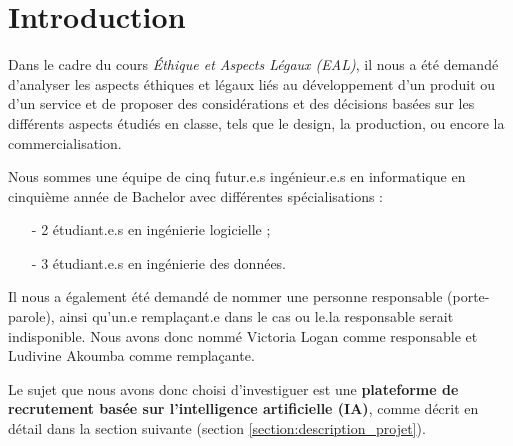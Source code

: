 \section{Introduction} 

Dans le cadre du cours \textit{Éthique et Aspects Légaux (EAL)}, il nous a été demandé d'analyser les aspects éthiques et légaux liés au développement d'un produit ou d'un service et de proposer des considérations et des décisions basées sur les différents aspects étudiés en classe, tels que le design, la production, ou encore la commercialisation.\newline

Nous sommes une équipe de cinq futur.e.s ingénieur.e.s en informatique en cinquième année de Bachelor avec différentes spécialisations :

\begin{enumerate}
    \item[-] 2 étudiant.e.s en ingénierie logicielle ; 
    \item[-] 3 étudiant.e.s en ingénierie des données.
\end{enumerate}


Il nous a également été demandé de nommer une personne responsable (porte-parole), ainsi qu'un.e remplaçant.e dans le cas ou le.la responsable serait indisponible. Nous avons donc nommé Victoria Logan comme responsable et Ludivine Akoumba comme remplaçante.\newline

Le sujet que nous avons donc choisi d'investiguer est une \textbf{plateforme de recrutement basée sur l'intelligence artificielle (IA)}, comme décrit en détail dans la section suivante (section \ref{section:description_projet}).
